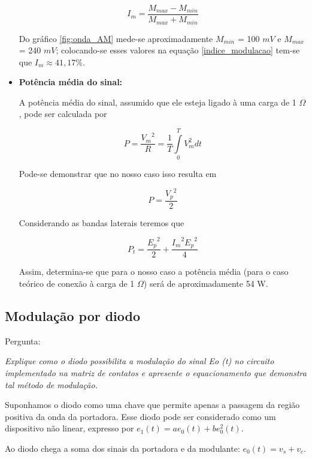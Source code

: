 \documentclass[]{report}
\begin{document}
\begin{itemize}
\begin{equation}\label{indice_modulacao}
I_m = \frac{M_{max} - M_{min}}{M_{max} + M_{min}}
\end{equation}

Do gráfico \ref{fig:onda_AM} mede-se aproximadamente $M_{min}$ = 100 $mV$ e $M_{max}$ = 240 $mV$; colocando-se esses valores na equação \ref{indice_modulacao} tem-se que $I_m \approx 41,17 \%$.
\item{\bf Potência média do sinal:}

A potência média do sinal, assumido que ele esteja ligado à uma carga de 1 $\Omega$, pode ser calculada por

\begin{equation}
P = \frac{{V_m}^2}{R} = \frac{1}{T}\int\limits_{0}^{T}{V_m^2}dt
\end{equation}

Pode-se demonstrar que no nosso caso isso resulta em

\begin{equation}
P = \frac{{V_p}^2}{2}
\end{equation}

Considerando as bandas laterais teremos que

\begin{equation}
P_t = \frac{{E_p}^2}{2} + \frac{{I_m}^2 {E_p}^2}{4}
\end{equation}

Assim, determina-se que para o nosso caso a potência média (para o caso teórico de conexão à carga de 1 $\Omega$) será de aproximadamente 54 W.


\end{itemize}
\subsection{Modulação por diodo}
Pergunta: \begin{flushright}
\textit{Explique como o diodo possibilita a modulação do sinal Eo (t) no circuito implementado na matriz de contatos e apresente o equacionamento que demonstra tal método de modulação.}
\end{flushright}

Suponhamos o diodo como uma chave que permite apenas a passagem da região positiva da onda da portadora. Esse diodo pode ser considerado como um dispositivo não linear, expresso por $e_1(t) = a e_0(t) + b e^2_0(t)$. 

Ao diodo chega a soma dos sinais da portadora e da modulante: $e_0(t) = v_s + v_c$.
\end{document}
